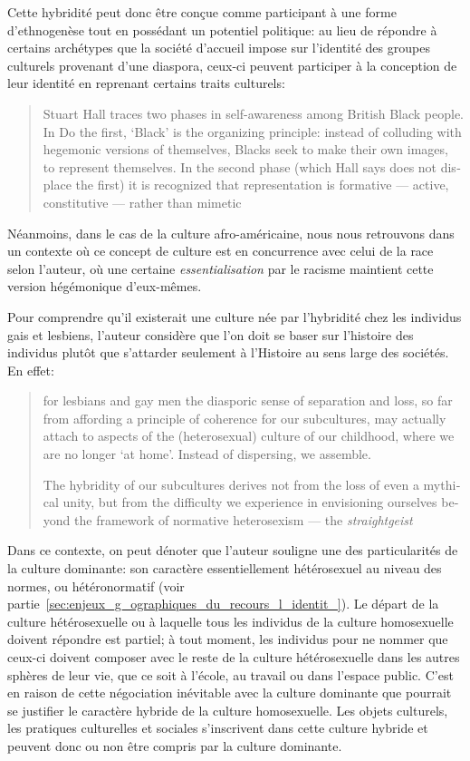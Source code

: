 Cette hybridité peut donc être conçue comme participant à une forme d'ethnogenèse tout en possédant un potentiel politique: au lieu de répondre à certains archétypes que la société d'accueil impose sur l'identité des groupes culturels provenant d'une diaspora, ceux-ci peuvent participer à la conception de leur identité en reprenant certains traits culturels:
\foreignblockquote{english}[{\cite[277]{Sinfield1996}}][.]{Stuart Hall traces two phases in self-awareness among British Black people. In Do the first, `Black' is the organizing principle: instead of colluding with hegemonic versions of themselves, Blacks seek to make their own images, to represent themselves. In the second phase (which Hall says does not displace the first) it is recognized that representation is formative --- active, constitutive --- rather than mimetic}.
Néanmoins, dans le cas de la culture afro-américaine, nous nous retrouvons dans un contexte où ce concept de culture est en concurrence avec celui de la race selon l'auteur, où une certaine \emph{essentialisation} par le racisme maintient cette version hégémonique d'eux-mêmes.

Pour comprendre qu'il existerait une culture née par l'hybridité chez les individus gais et lesbiens, l'auteur considère que l'on doit se baser sur l'histoire des individus plutôt que s'attarder seulement à l'Histoire au sens large des sociétés.
En effet: \foreignblockquote{english}[{\cite[280]{Sinfield1996}}][.]{\textelp{} for lesbians and gay men the diasporic sense of separation and loss, so far from affording a principle of coherence for our subcultures, may actually attach to aspects of the (heterosexual) culture of our childhood, where we are no longer `at home'. Instead of dispersing, we assemble.

The hybridity of our subcultures derives not from the loss of even a mythical unity, but from the difficulty we experience in envisioning ourselves beyond the framework of normative heterosexism --- the \emph{straightgeist} \textelp{}}
Dans ce contexte, on peut dénoter que l'auteur souligne une des particularités de la culture dominante: son caractère essentiellement hétérosexuel au niveau des normes, ou hétéronormatif (voir partie~\ref{sec:enjeux_g_ographiques_du_recours_l_identit_}).
Le départ de la culture hétérosexuelle ou  à laquelle tous les individus de la culture homosexuelle doivent répondre est partiel; à tout moment, les individus \lgbt{} pour ne nommer que ceux-ci doivent composer avec le reste de la culture hétérosexuelle dans les autres sphères de leur vie, que ce soit à l'école, au travail ou dans l'espace public.
C'est en raison de cette négociation inévitable avec la culture dominante que pourrait se justifier le caractère hybride de la culture homosexuelle.
Les objets culturels, les pratiques culturelles et sociales s'inscrivent dans cette culture hybride et peuvent donc ou non être compris par la culture dominante.

